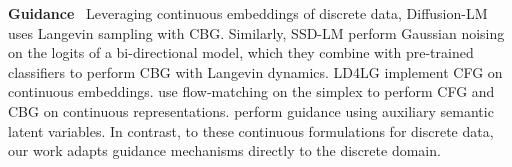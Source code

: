 \documentclass{article} %
\begin{document}
\textbf{Guidance}~
Leveraging continuous embeddings of discrete data, Diffusion-LM \citep{li2022diffusion} uses Langevin sampling with CBG.
Similarly, SSD-LM \citep{han2022ssd} perform Gaussian noising on the logits of a bi-directional model, which they combine with pre-trained classifiers to perform CBG with Langevin dynamics.
LD4LG \citep{lovelace2024latent} implement CFG on continuous embeddings.
\cite{stark2024dirichlet} use flow-matching on the simplex to perform CFG and CBG on continuous representations.
\citet{wang2023infodiffusion} perform guidance using auxiliary semantic latent variables.
In contrast, to these continuous formulations for discrete data, our work adapts guidance mechanisms directly to the discrete domain.

\end{document}
